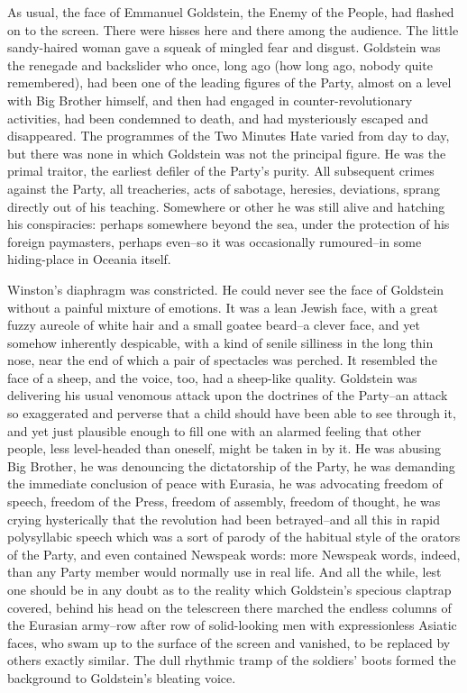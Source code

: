 \documentclass{article}
\begin{document}
As usual, the face of Emmanuel Goldstein, the Enemy of the People, had
flashed on to the screen. There were hisses here and there among the
audience. The little sandy-haired woman gave a squeak of mingled fear and
disgust. Goldstein was the renegade and backslider who once, long ago
(how long ago, nobody quite remembered), had been one of the leading
figures of the Party, almost on a level with Big Brother himself, and
then had engaged in counter-revolutionary activities, had been condemned
to death, and had mysteriously escaped and disappeared. The programmes
of the Two Minutes Hate varied from day to day, but there was none in
which Goldstein was not the principal figure. He was the primal traitor,
the earliest defiler of the Party's purity. All subsequent crimes against
the Party, all treacheries, acts of sabotage, heresies, deviations,
sprang directly out of his teaching. Somewhere or other he was still
alive and hatching his conspiracies: perhaps somewhere beyond the sea,
under the protection of his foreign paymasters, perhaps even--so it was
occasionally rumoured--in some hiding-place in Oceania itself.

Winston's diaphragm was constricted. He could never see the face of
Goldstein without a painful mixture of emotions. It was a lean Jewish face,
with a great fuzzy aureole of white hair and a small goatee beard--a
clever face, and yet somehow inherently despicable, with a kind of senile
silliness in the long thin nose, near the end of which a pair of spectacles
was perched. It resembled the face of a sheep, and the voice, too, had a
sheep-like quality. Goldstein was delivering his usual venomous attack
upon the doctrines of the Party--an attack so exaggerated and perverse that
a child should have been able to see through it, and yet just plausible
enough to fill one with an alarmed feeling that other people, less
level-headed than oneself, might be taken in by it. He was abusing Big
Brother, he was denouncing the dictatorship of the Party, he was demanding
the immediate conclusion of peace with Eurasia, he was advocating freedom
of speech, freedom of the Press, freedom of assembly, freedom of thought,
he was crying hysterically that the revolution had been betrayed--and all
this in rapid polysyllabic speech which was a sort of parody of the
habitual style of the orators of the Party, and even contained Newspeak
words: more Newspeak words, indeed, than any Party member would normally
use in real life. And all the while, lest one should be in any doubt as to
the reality which Goldstein's specious claptrap covered, behind his head on
the telescreen there marched the endless columns of the Eurasian army--row
after row of solid-looking men with expressionless Asiatic faces, who swam
up to the surface of the screen and vanished, to be replaced by others
exactly similar. The dull rhythmic tramp of the soldiers' boots formed the
background to Goldstein's bleating voice.
\end{document}
